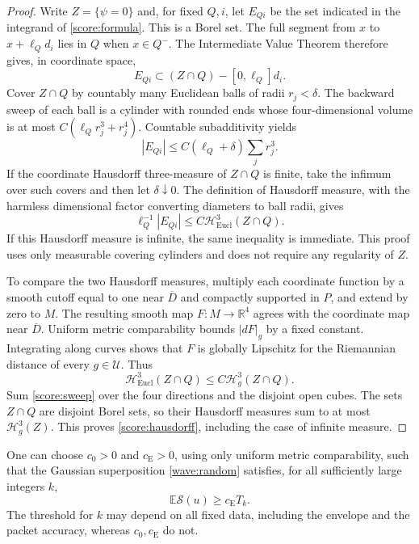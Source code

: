 \begin{proof}
Write $Z=\{\psi=0\}$ and, for fixed $Q,i$, let $E_{Qi}$ be the
set indicated in the integrand of \eqref{score:formula}.  This is a
Borel set.  The full segment from $x$ to $x+\ell_Qd_i$ lies in $Q$
when $x\in Q^-$.  The Intermediate Value Theorem therefore gives,
in coordinate space,
\[
 E_{Qi}\subset (Z\cap Q)-[0,\ell_Q]d_i.
\]
Cover $Z\cap Q$ by countably many Euclidean balls of radii
$r_j<\delta$.  The backward sweep of each ball is a cylinder with
rounded ends whose four-dimensional volume is at most
$C(\ell_Qr_j^3+r_j^4)$.  Countable subadditivity yields
\[
 |E_{Qi}|\le C(\ell_Q+\delta)\sum_jr_j^3.
\]
If the coordinate Hausdorff three-measure of $Z\cap Q$ is finite,
take the infimum over such covers and then let $\delta\downarrow0$.
The definition of Hausdorff measure, with the harmless dimensional
factor converting diameters to ball radii, gives
\begin{equation}\label{score:sweep}
 \ell_Q^{-1}|E_{Qi}|
 \le C\mathcal H^3_{\mathrm{Eucl}}(Z\cap Q).
\end{equation}
If this Hausdorff measure is infinite, the same inequality is immediate.
This proof uses only measurable covering cylinders and does not require
any regularity of $Z$.

To compare the two Hausdorff measures, multiply each coordinate function
by a smooth cutoff equal to one near $\overline D$ and compactly
supported in $P$, and extend by zero to $M$.  The resulting smooth map
$F:M\to\mathbb R^4$ agrees with the coordinate map near $\overline D$.
Uniform metric comparability bounds $|dF|_g$ by a fixed constant.
Integrating along curves shows that $F$ is globally Lipschitz for the
Riemannian distance of every $g\in\mathcal U$.  Thus
\[
 \mathcal H^3_{\mathrm{Eucl}}(Z\cap Q)
 \le C\mathcal H_g^3(Z\cap Q).
\]
Sum \eqref{score:sweep} over the four directions and the disjoint
open cubes.  The sets $Z\cap Q$ are disjoint Borel sets, so their
Hausdorff measures sum to at most $\mathcal H_g^3(Z)$.  This proves
\eqref{score:hausdorff}, including the case of infinite measure.
\end{proof}

\begin{lemma}\label{score:expectation}
One can choose $c_0>0$ and $c_{\mathrm E}>0$, using only uniform
metric comparability, such that the Gaussian superposition
\eqref{wave:random} satisfies, for all sufficiently large integers $k$,
\begin{equation}\label{score:expected}
 \mathbb E\mathcal S(u)\ge c_{\mathrm E}T_k.
\end{equation}
The threshold for $k$ may depend on all fixed data, including the envelope
and the packet accuracy, whereas $c_0,c_{\mathrm E}$ do not.
\end{lemma}

